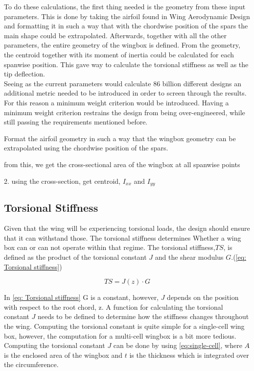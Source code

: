 \noindent To do these calculations, the first thing needed is the geometry from these input parameters. This is done by taking the airfoil found in Wing Aerodynamic Design\cite{Koppejan2024WingDesign} and formatting it in such a way that with the chordwise position of the spars the main shape could be extrapolated. Afterwards, together with all the other parameters, the entire geometry of the wingbox is defined. From the geometry, the centroid together with its moment of inertia could be calculated for each spanwise position. This gave way to calculate the torsional stiffness as well as the tip deflection.\\

Seeing as the current parameters would calculate 86 billion different designs an additional metric needed to be introduced in order to screen through the results. For this reason a minimum weight criterion would be introduced. Having a minimum weight criterion restrains the design from being over-engineered, while still passing the requirements mentioned before. 



Format the airfoil geometry in such a way that the wingbox geometry can be extrapolated using the chordwise position of the spars.


    from this, we get the cross-sectional area of the wingbox at all spanwise points

    2. using the cross-section, get centroid, $I_{xx}$ and $I_{yy}$ 

\subsection{Torsional Stiffness}

Given that the wing will be experiencing torsional loads, the design should ensure that it can withstand those. The torsional stiffness determines Whether a wing box can or can not operate within that regime. The torsional stiffness,$TS$, is defined as the product of the torsional constant $J$ and the shear modulus $G$.(\autoref{eq: Torsional stiffness}\cite{})

\begin{equation}
    \label{eq: Torsional stiffness}
    TS = J(z)\cdot G
\end{equation}

In \autoref{eq: Torsional stiffness} G is a constant, however, $J$ depends on the position with respect to the root chord, z. A function for calculating the torsional constant $J$ needs to be defined to determine how the stiffness changes throughout the wing. Computing the torsional constant is quite simple for a single-cell wing box, however, the computation for a multi-cell wingbox is a bit more tedious. Computing the torsional constant $J$ can be done by using \autoref{eq:single-cell}, where $A$ is the enclosed area of the wingbox and $t$ is the thickness which is integrated over the circumference.



